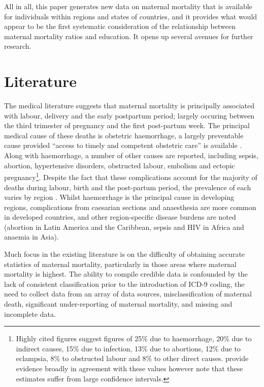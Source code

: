 \documentclass{article}[12pt,subeqn]
\begin{document}
\begin{spacing}{1.4}
All in all, this paper generates new data on maternal mortality that is available for individuals within 
regions and states of countries, and it provides what would appear to be the first systematic consideration 
of the relationship between maternal mortality ratios and education. It opens up several avenues for further 
research.

\section{Literature}
The medical literature suggests that maternal mortality is principally associated with labour, delivery and 
the early postpartum period; largely occuring between the third trimester of pregnancy and the first post-partum 
week. The principal medical cause of these deaths is obstetric haemorrhage, a largely preventable cause provided 
``access to timely and competent obstetric care'' is available \citep{RonsmansGraham2006}.  Along with haemorrhage, 
a number of other causes are reported, including sepsis, abortion, hypertensive disorders, obstructed labour, 
embolism and ectopic pregnancy\footnote{Highly cited figures \citep{WHOetal1991} suggest figures of 25\% due to 
haemorrhage, 20\% due to indirect causes, 15\% due to infection, 13\% due to abortions, 12\% due to eclampsia, 
8\% to obstructed labour and 8\% to other direct causes. \citet{Khanetal2006} provide evidence broadly in agreement 
with these values however note that these estimates suffer from large confidence intervals.}.  Despite the fact that 
these complications account for the majority of deaths during labour, birth and the post-partum period, the prevalence 
of each varies by region \citep{Khanetal2006}.  Whilst haemorrhage is the principal cause in developing regions, 
complications from caesarian sections and anaesthesia are more common in developed countries, and other region-specific 
disease burdens are noted (abortion in Latin America and the Caribbean, sepsis and HIV in Africa and anaemia in 
Asia).

Much focus in the existing literature is on the difficulty of obtaining accurate statistics of maternal mortality, particularly 
in those areas where maternal mortality is highest\citep{RonsmansGraham2006, MccarthyMaine1992, McAlisterBaskett2006}.  The 
ability to compile credible data is confounded by the lack of consistent classification prior to the introduction of ICD-9 
coding, the need to collect data from an array of data sources, misclassification of maternal death, significant under-reporting 
of maternal mortality, and missing and incomplete data\citep{Yazbeck2007, Hoganetal2010}.


\end{spacing}
\end{document}
